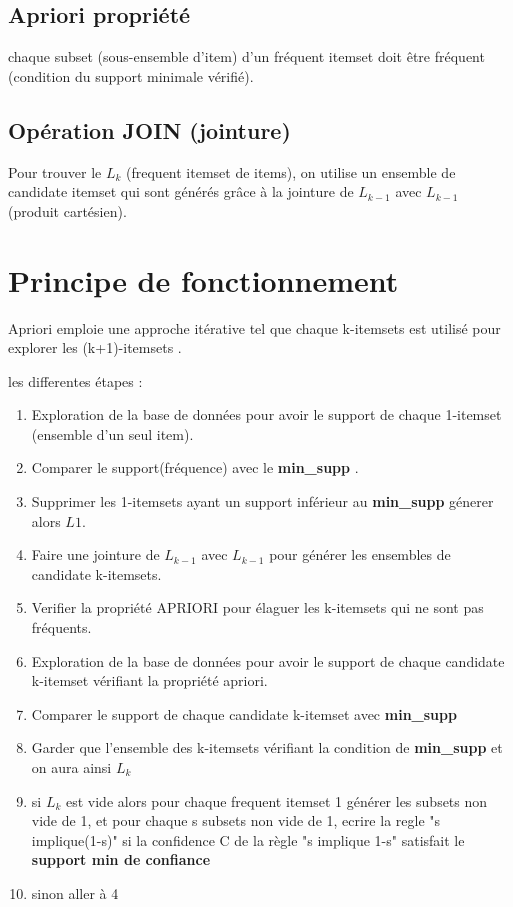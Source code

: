 \documentclass[12pt,a4paper,oneside]{book}
\begin{document}
\subsection*{Apriori propriété }
chaque subset (sous-ensemble d'item) d'un fréquent itemset doit être fréquent (condition du support minimale vérifié).
\subsection*{Opération JOIN (jointure)}
Pour trouver le $L_{k}$ (frequent itemset de items), on utilise  un ensemble de candidate itemset qui sont générés grâce à la jointure de $L_{k-1}$ avec $L_{k-1}$ (produit cartésien).
 
   
\section{Principe de fonctionnement}
Apriori emploie une approche itérative  tel que chaque k-itemsets est utilisé pour explorer les (k+1)-itemsets .

les differentes étapes :

\begin{enumerate}
\item Exploration de la base de données pour avoir le support de chaque 1-itemset (ensemble d'un seul item).
\item Comparer le support(fréquence) avec le\textbf{ min\_supp} .
\item  Supprimer les 1-itemsets ayant un support inférieur au \textbf{ min\_supp} génerer alors $L1$.
\item Faire une jointure de $L_{k-1}$ avec $L_{k-1}$  pour générer les ensembles de candidate k-itemsets.
\item Verifier la propriété APRIORI  pour élaguer les k-itemsets qui ne sont pas fréquents.
\item Exploration de la base de données pour avoir le support de chaque candidate k-itemset vérifiant la propriété apriori.
\item Comparer le support de chaque candidate k-itemset avec \textbf{ min\_supp}
\item Garder que l'ensemble des k-itemsets vérifiant la condition de  \textbf{ min\_supp} et on aura ainsi $L_{k}$
\item si $L_{k}$ est vide alors pour chaque frequent itemset 1 générer les subsets non vide de 1, et pour chaque s subsets non vide de 1, ecrire la regle "s implique(1-s)" si la confidence C de la règle "s implique 1-s" satisfait le \textbf{support min de confiance }
\item sinon aller à 4
\end{enumerate}
\end{document}
